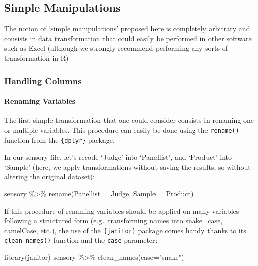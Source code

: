 \documentclass[
]{book}
\newenvironment{Shaded}{\begin{snugshade}}{\end{snugshade}}
\newcommand{\AttributeTok}[1]{\textcolor[rgb]{0.77,0.63,0.00}{#1}}
\newcommand{\FunctionTok}[1]{\textcolor[rgb]{0.00,0.00,0.00}{#1}}
\newcommand{\NormalTok}[1]{#1}
\newcommand{\SpecialCharTok}[1]{\textcolor[rgb]{0.00,0.00,0.00}{#1}}
\newcommand{\StringTok}[1]{\textcolor[rgb]{0.31,0.60,0.02}{#1}}
\begin{document}
\hypertarget{simple-manipulations}{%
\subsection{Simple Manipulations}\label{simple-manipulations}}

The notion of `simple manipulations' proposed here is completely arbitrary and consists in data transformation that could easily be performed in other software such as Excel (although we strongly recommend performing any sorts of transformation in R)

\hypertarget{handling-columns}{%
\subsubsection{Handling Columns}\label{handling-columns}}

\hypertarget{renaming-variables}{%
\paragraph{Renaming Variables}\label{renaming-variables}}

The first simple transformation that one could consider consists in renaming one or multiple variables.
This procedure can easily be done using the \texttt{rename()} function from the \texttt{\{dplyr\}} package.

In our sensory file, let's recode `Judge' into `Panellist', and `Product' into `Sample' (here, we apply transformations without saving the results, so without altering the original dataset):

\begin{Shaded}
\begin{Highlighting}[]
\NormalTok{sensory }\SpecialCharTok{\%\textgreater{}\%} 
  \FunctionTok{rename}\NormalTok{(}\AttributeTok{Panellist =}\NormalTok{ Judge, }\AttributeTok{Sample =}\NormalTok{ Product)}
\end{Highlighting}
\end{Shaded}

If this procedure of renaming variables should be applied on many variables following a structured form (e.g.~transforming names into snake\_case, camelCase, etc.), the use of the \texttt{\{janitor\}} package comes handy thanks to its \texttt{clean\_names()} function and the \texttt{case} parameter:

\begin{Shaded}
\begin{Highlighting}[]
\FunctionTok{library}\NormalTok{(janitor)}
\NormalTok{sensory }\SpecialCharTok{\%\textgreater{}\%} 
  \FunctionTok{clean\_names}\NormalTok{(}\AttributeTok{case=}\StringTok{"snake"}\NormalTok{)}
\end{Highlighting}
\end{Shaded}
\end{document}
